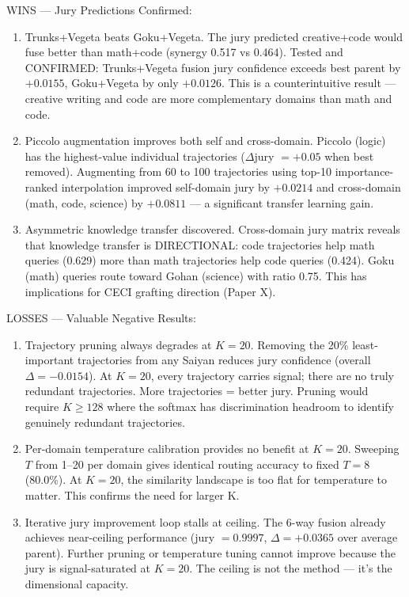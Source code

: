 \documentclass[11pt]{article}
\begin{document}
WINS --- Jury Predictions Confirmed:
\begin{enumerate}[nosep]
\item Trunks+Vegeta beats Goku+Vegeta. The jury predicted creative+code would fuse better than math+code (synergy 0.517 vs 0.464). Tested and CONFIRMED: Trunks+Vegeta fusion jury confidence exceeds best parent by $+0.0155$, Goku+Vegeta by only $+0.0126$. This is a counterintuitive result --- creative writing and code are more complementary domains than math and code.
\item Piccolo augmentation improves both self and cross-domain. Piccolo (logic) has the highest-value individual trajectories ($\Delta$jury $= +0.05$ when best removed). Augmenting from 60 to 100 trajectories using top-10 importance-ranked interpolation improved self-domain jury by $+0.0214$ and cross-domain (math, code, science) by $+0.0811$ --- a significant transfer learning gain.
\item Asymmetric knowledge transfer discovered. Cross-domain jury matrix reveals that knowledge transfer is DIRECTIONAL: code trajectories help math queries (0.629) more than math trajectories help code queries (0.424). Goku (math) queries route toward Gohan (science) with ratio 0.75. This has implications for CECI grafting direction (Paper X).
\end{enumerate}

LOSSES --- Valuable Negative Results:
\begin{enumerate}[nosep]
\item Trajectory pruning always degrades at $K=20$. Removing the 20\% least-important trajectories from any Saiyan reduces jury confidence (overall $\Delta = -0.0154$). At $K=20$, every trajectory carries signal; there are no truly redundant trajectories. More trajectories = better jury. Pruning would require $K \ge 128$ where the softmax has discrimination headroom to identify genuinely redundant trajectories.
\item Per-domain temperature calibration provides no benefit at $K=20$. Sweeping $T$ from 1--20 per domain gives identical routing accuracy to fixed $T=8$ (80.0\%). At $K=20$, the similarity landscape is too flat for temperature to matter. This confirms the need for larger K.
\item Iterative jury improvement loop stalls at ceiling. The 6-way fusion already achieves near-ceiling performance (jury $= 0.9997$, $\Delta = +0.0365$ over average parent). Further pruning or temperature tuning cannot improve because the jury is signal-saturated at $K=20$. The ceiling is not the method --- it's the dimensional capacity.
\end{enumerate}
\end{document}
